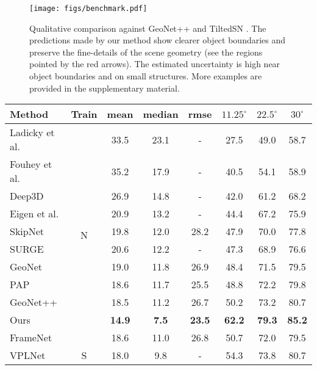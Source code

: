 \documentclass[10pt,twocolumn,letterpaper]{article}
\begin{document}
\begin{figure*}[t]
\begin{center}
\texttt{[image: figs/benchmark.pdf]}
\end{center}
\caption{Qualitative comparison against GeoNet++ \cite{SNfromRGB_20_GeoNet++} and TiltedSN \cite{SNfromRGB_20_TiltedSN}. The predictions made by our method show clearer object boundaries and preserve the fine-details of the scene geometry (see the regions pointed by the red arrows). The estimated uncertainty is high near object boundaries and on small structures. More examples are provided in the supplementary material.}
\label{fig:bm}
\end{figure*}

\begin{table}[t]
\small
\setlength\tabcolsep{1.5pt}
\begin{center}
\begin{tabular}{l|c|ccc|ccc}
\toprule
Method & Train & mean & median & rmse & $11.25^{\circ}$ & $22.5^{\circ}$ & $30^{\circ}$ \\
\midrule
Ladicky et al. \cite{SNfromRGB_14_Ladicky} & \multirow{11}{*}{N} & 33.5 & 23.1 & - & 27.5 & 49.0 & 58.7 \\
Fouhey et al. \cite{SNfromRGB_14_Fouhey} & & 35.2 & 17.9 & - & 40.5 & 54.1 & 58.9 \\
Deep3D \cite{SNfromRGB_15_Deep3D} & & 26.9 & 14.8 & - & 42.0 & 61.2 & 68.2 \\
Eigen et al. \cite{SNfromRGB_15_Eigen} & & 20.9 & 13.2 & - & 44.4 & 67.2 & 75.9 \\
SkipNet \cite{SNfromRGB_16_SkipNet} & & 19.8 & 12.0 & 28.2 & 47.9 & 70.0 & 77.8 \\
SURGE \cite{SNfromRGB_16_SURGE} & & 20.6 & 12.2 & - & 47.3 & 68.9 & 76.6 \\
GeoNet \cite{SNfromRGB_18_GeoNet} & & 19.0 & 11.8 & 26.9 & 48.4 & 71.5 & 79.5 \\
PAP \cite{SNfromRGB_19_PAP} & & 18.6 & 11.7 & 25.5 & 48.8 & 72.2 & 79.8 \\
GeoNet++ \cite{SNfromRGB_20_GeoNet++} & & 18.5 & 11.2 & 26.7 & 50.2 & 73.2 & 80.7 \\
\hline
Ours & N & \textbf{14.9} & \textbf{7.5} & \textbf{23.5} & \textbf{62.2} & \textbf{79.3} & \textbf{85.2} \\
\hline
\hline
FrameNet\cite{SNfromRGB_19_FrameNet} & & 18.6 & 11.0 & 26.8 & 50.7 & 72.0 & 79.5 \\
VPLNet\cite{SNfromRGB_20_VPLNet} & S & 18.0 & 9.8 & - & 54.3 & 73.8 & 80.7 \\

\end{tabular}
\end{center}
\end{table}
\end{document}
